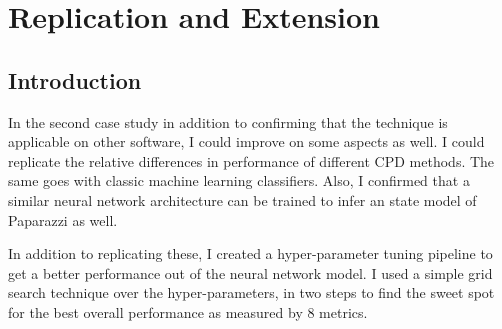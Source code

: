 \chapter{Replication and Extension}

\section{Introduction}


In the second case study in addition to confirming that the technique is applicable on other software, I could improve on some aspects as well.
I could replicate the relative differences in performance of different CPD methods. The same goes with classic machine learning classifiers.
Also, I confirmed that a similar neural network architecture can be trained to infer an state model of Paparazzi as well.

In addition to replicating these, I created a hyper-parameter tuning pipeline to get a better performance out of the neural network model. I used a simple grid search technique over the hyper-parameters, in two steps to find the sweet spot for the best overall performance as measured by 8 metrics.
